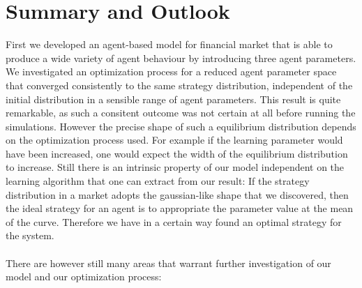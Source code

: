 \documentclass[11pt]{article}
\begin{document}
\section{Summary and Outlook}
First we developed an agent-based model for financial market that is able to produce a wide variety of agent behaviour by introducing three agent parameters. We investigated an optimization process for a reduced agent parameter space that converged consistently to the same strategy distribution, independent of the initial distribution in a sensible range of agent parameters. This result is quite remarkable, as such a consitent outcome was not certain at all before running the simulations. However the precise shape of such a equilibrium distribution depends on the optimization process used. For example if the learning parameter would have been increased, one would expect the width of the equilibrium distribution to increase. Still there is an intrinsic property of our model independent on the learning algorithm that one can extract from our result: If the strategy distribution in a market adopts the gaussian-like shape that we discovered, then the ideal strategy for an agent is to appropriate the parameter value at the mean of the curve. Therefore we have in a certain way found an optimal strategy for the system. \\
\hfill \\
There are however still many areas that warrant further investigation of our model and our optimization process:
\end{document}
